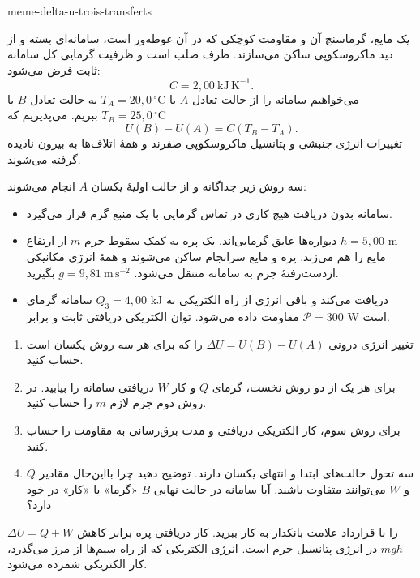 \begin{exo}{meme-delta-u-trois-transferts}

یک مایع، گرماسنج آن و مقاومت کوچکی که در آن غوطه‌ور است، سامانه‌ای بسته و
از دید ماکروسکوپی ساکن می‌سازند. ظرف صلب است و ظرفیت گرمایی کل سامانه ثابت
فرض می‌شود:
\[
C=2{,}00\ \mathrm{kJ\,K^{-1}}.
\]
می‌خواهیم سامانه را از حالت تعادل $A$ با $T_A=20{,}0\,^\circ\mathrm{C}$
به حالت تعادل $B$ با $T_B=25{,}0\,^\circ\mathrm{C}$ ببریم. می‌پذیریم که
\[
U(B)-U(A)=C(T_B-T_A).
\]
تغییرات انرژی جنبشی و پتانسیل ماکروسکوپی صفرند و همهٔ اتلاف‌ها به بیرون نادیده گرفته می‌شوند.

سه روش زیر جداگانه و از حالت اولیهٔ یکسان $A$ انجام می‌شوند:
\begin{itemize}
\item[روش 1] سامانه بدون دریافت هیچ کاری در تماس گرمایی با یک منبع گرم قرار می‌گیرد.
\item[روش 2] دیواره‌ها عایق گرمایی‌اند. یک پره به کمک سقوط جرم $m$ از ارتفاع $h=5{,}00$ m مایع را هم می‌زند. پره و مایع سرانجام ساکن می‌شوند و همهٔ انرژی مکانیکی ازدست‌رفتهٔ جرم به سامانه منتقل می‌شود. $g=9{,}81\ \mathrm{m\,s^{-2}}$ بگیرید.
\item[روش 3] سامانه گرمای $Q_3=4{,}00$ kJ دریافت می‌کند و باقی انرژی از راه الکتریکی به مقاومت داده می‌شود. توان الکتریکی دریافتی ثابت و برابر $\mathcal P=300$ W است.
\end{itemize}

\begin{enumerate}
\item تغییر انرژی درونی $\Delta U=U(B)-U(A)$ را که برای هر سه روش یکسان است حساب کنید.
\item برای هر یک از دو روش نخست، گرمای $Q$ و کار $W$ دریافتی سامانه را بیابید. در روش دوم جرم لازم $m$ را حساب کنید.
\item برای روش سوم، کار الکتریکی دریافتی و مدت برق‌رسانی به مقاومت را حساب کنید.
\item سه تحول حالت‌های ابتدا و انتهای یکسان دارند. توضیح دهید چرا بااین‌حال مقادیر $Q$ و $W$ می‌توانند متفاوت باشند. آیا سامانه در حالت نهایی $B$ «گرما» یا «کار» در خود دارد؟
\end{enumerate}

\begin{indication}
$\Delta U=Q+W$ را با قرارداد علامت بانکدار به کار ببرید. کار دریافتی پره برابر
کاهش $mgh$ در انرژی پتانسیل جرم است. انرژی الکتریکی که از راه سیم‌ها از مرز
می‌گذرد، کار الکتریکی شمرده می‌شود.
\end{indication}


\end{exo}
